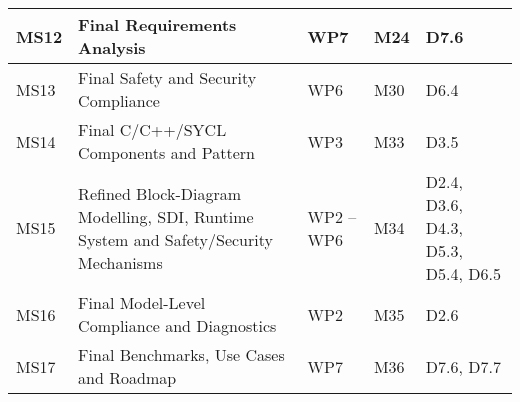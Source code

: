 \documentclass[a4paper,11pt]{article}
\begin{document}
\begin{minipage}{\textwidth}
\begin{center}
\begin{tabular*}{\textwidth}{|p{1.5cm}|p{8.3cm}|p{1.2cm}|p{0.6cm}|p{4.2cm}|}
\hline
MS12 & Final Requirements Analysis  & WP7 & M24 & D7.6 \\
\hline
MS13 & Final Safety and Security Compliance  & WP6 & M30 & D6.4 \\
\hline
MS14 & Final C/C++/SYCL Components and Pattern  & WP3 & M33 & D3.5 \\
\hline
MS15 & Refined Block-Diagram Modelling, SDI, Runtime System and Safety/Security Mechanisms & WP2 -- WP6 & M34 & D2.4, D3.6, D4.3, D5.3, D5.4, D6.5\\
\hline
MS16 & Final Model-Level Compliance and Diagnostics & WP2 & M35 & D2.6 \\
\hline
MS17 & Final Benchmarks, Use Cases and Roadmap & WP7 & M36 & D7.6, D7.7\\
\hline
\end{tabular*}
\end{center}
\end{minipage}
\end{document}
